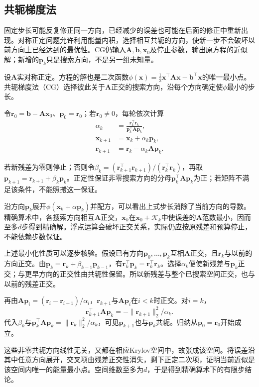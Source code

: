 \subsection{共轭梯度法}

固定步长可能反复修正同一方向，已经减少的误差也可能在后面的修正中重新出现。对称正定问题允许利用能量内积，选择相互共轭的方向，使新一步不会破坏以前方向上已经达到的最优性。CG仍输入$\bm A,\bm b,\bm x_0$及停止参数，输出原方程的近似解；新增的$\bm p_k$只是搜索方向，不是另一组未知量。

设$\bm A$实对称正定。方程的解也是二次函数$\phi(\bm x)=\tfrac12\bm x^\top\bm A\bm x-\bm b^\top\bm x$的唯一最小点。共轭梯度法（CG）选择彼此关于$\bm A$正交的搜索方向，沿每个方向确定使$\phi$最小的步长。

令$\bm r_0=\bm b-\bm A\bm x_0$、$\bm p_0=\bm r_0$；若$\bm r_0\ne0$，每轮依次计算
\begin{align*}
 \alpha_k&=\frac{\bm r_k^\top\bm r_k}{\bm p_k^\top\bm A\bm p_k},\\
 \bm x_{k+1}&=\bm x_k+\alpha_k\bm p_k,\\
 \bm r_{k+1}&=\bm r_k-\alpha_k\bm A\bm p_k.
\end{align*}

若新残差为零则停止；否则令$\beta_k=(\bm r_{k+1}^\top\bm r_{k+1})/(\bm r_k^\top\bm r_k)$，再取$\bm p_{k+1}=\bm r_{k+1}+\beta_k\bm p_k$。正定性保证非零搜索方向的分母$\bm p_k^\top\bm A\bm p_k$为正；若矩阵不满足该条件，不能照搬这一保证。

沿方向$\bm p_k$展开$\phi(\bm x_k+\alpha\bm p_k)$并配方，可以看出上式步长消除了当前方向的导数。精确算术中，各搜索方向相互$\bm A$正交，$\bm x_k$在$\bm x_0+\mathcal K_k$中使误差的$\bm A$范数最小，因而至多$d$步得到精确解。浮点运算会破坏正交关系，实际仍应按原残差和预算停止，不能依赖步数保证。

上述最小化性质可以逐步核验。假设已有方向$\bm p_0,\ldots,\bm p_k$互相$\bm A$正交，且$\bm r_k$与以前的方向正交。由$\bm p_k=\bm r_k+\beta_{k-1}\bm p_{k-1}$，有$\bm r_k^\top\bm p_k=\bm r_k^\top\bm r_k$。选择$\alpha_k$便使新残差与$\bm p_k$正交；与更早方向的正交性由共轭性保留。所以新残差与整个已搜索空间正交，也与以前的残差正交。

再由$\bm A\bm p_i=(\bm r_i-\bm r_{i+1})/\alpha_i$，$\bm r_{k+1}$与$\bm A\bm p_i$在$i<k$时正交。对$i=k$，
\[
 \bm r_{k+1}^\top\bm A\bm p_k=-\|\bm r_{k+1}\|_2^2/\alpha_k.
\]
代入$\beta_k$与$\bm p_k^\top\bm A\bm p_k=\|\bm r_k\|_2^2/\alpha_k$，可见$\bm p_{k+1}$也与$\bm p_k$共轭。归纳从$\bm p_0=\bm r_0$开始成立。

这些非零共轭方向线性无关，又都在相应Krylov空间中，故张成该空间。将误差沿其中任意方向展开，交叉项由残差正交性消失，剩下正定二次项，证明当前近似是该空间内唯一的能量最小点。空间维数至多为$d$，于是得到精确算术下的有限步结论。

